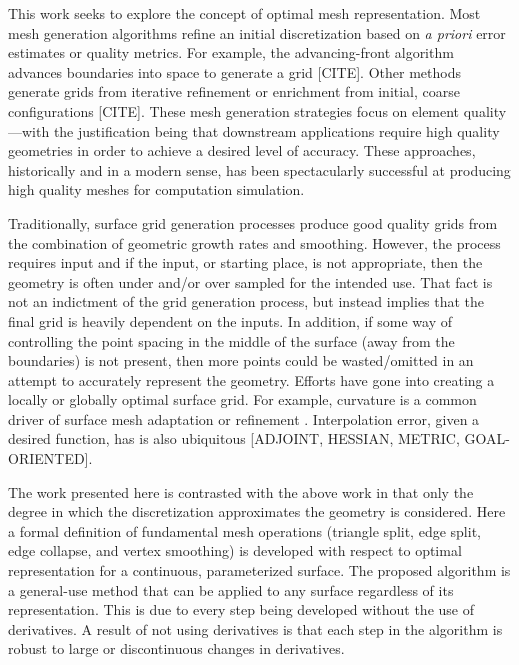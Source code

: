 This work seeks to explore the concept of optimal mesh representation.
Most mesh generation algorithms refine an initial discretization based
on {\it a priori} error estimates or quality metrics. For example, the
advancing-front algorithm advances boundaries into space to generate a
grid \cite{tristrano98, diaz-morcillo98}[CITE]. Other methods generate
grids from iterative refinement or enrichment from initial, coarse
configurations \cite{marcum98, marcum00, shewchuk02}[CITE]. These mesh
generation strategies focus on element quality---with the
justification being that downstream applications require high quality
geometries in order to achieve a desired level of accuracy. These
approaches, historically and in a modern sense, has been spectacularly
successful at producing high quality meshes for computation simulation.

Traditionally, surface grid generation processes produce good quality
grids from the combination of geometric growth rates and smoothing.
However, the process requires input and if the input, or starting place,
is not appropriate, then the geometry is often under and/or over sampled
for the intended use. That fact is not an indictment of the grid
generation process, but instead implies that the final grid is heavily
dependent on the inputs. In addition, if some way of controlling the
point spacing in the middle of the surface (away from the boundaries) is
not present, then more points could be wasted/omitted in an attempt to
accurately represent the geometry. Efforts have gone into
creating a locally or globally optimal surface grid. For example,
curvature is a common driver of surface mesh adaptation or refinement
\cite{siqueria13}. Interpolation error, given a desired function, has
is also ubiquitous [ADJOINT, HESSIAN, METRIC, GOAL-ORIENTED]\cite{}.

The work presented here is contrasted with the above work in that only
the degree in which the discretization approximates the geometry is
considered.  Here a formal definition of fundamental mesh operations
(triangle split, edge split, edge collapse, and vertex smoothing) is
developed with respect to optimal representation for a continuous,
parameterized surface. The proposed algorithm is a general-use method
that can be applied to any surface regardless of its representation.
This is due to every step being developed without the use of
derivatives. A result of not using derivatives is that each step in the
algorithm is robust to large or discontinuous changes in derivatives.

